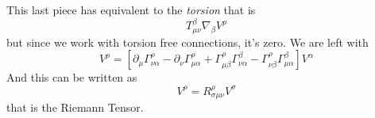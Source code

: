 This last piece has equivalent to the \emph{torsion} that is
\[
T^{\beta }_{\mu \nu }\nabla _{\beta }V^{\rho }
\]
but since we work with torsion free connections, it's zero. We are left with
\begin{equation}
	[\nabla _{\mu }, \nabla _{\nu }]V^{\rho } = [\partial_{\mu }\Gamma ^{\rho }_{\nu \alpha } - \partial_{\nu }\Gamma ^{\rho }_{\mu \alpha } + \Gamma  ^{\rho }_{\mu  \beta }\Gamma  ^{ \beta }_{\nu  \alpha } - \Gamma ^{\rho }_{\nu \beta }\Gamma ^{\beta }_{\mu \alpha }] V^{\alpha }
\end{equation}
And this can be written as 
\begin{equation}
	[\nabla _{\mu }, \nabla _{\nu }] V^{ \rho } = R^{\rho }_{\sigma \mu \nu } V^{\sigma }
\end{equation}
that is the Riemann Tensor.






